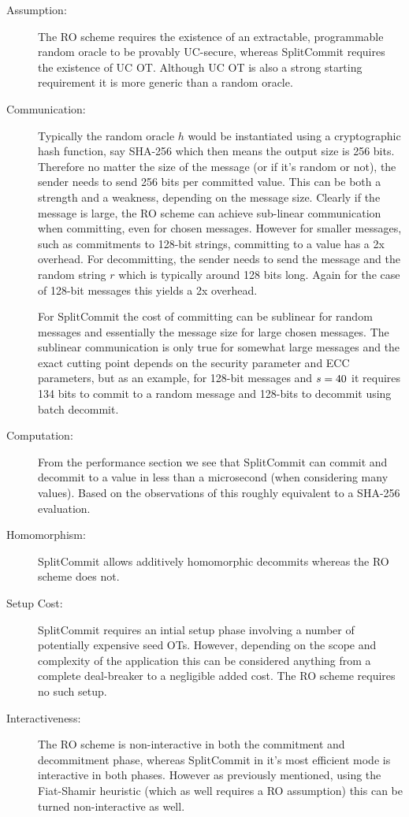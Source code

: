 \begin{description}
  \item[Assumption:] The RO scheme requires the existence of an extractable, programmable random oracle to be provably UC-secure, whereas SplitCommit requires the existence of UC OT. Although UC OT is also a strong starting requirement it is more generic than a random oracle.
  \item[Communication:] Typically the random oracle $h$ would be instantiated using a cryptographic hash function, say SHA-256 which then means the output size is 256 bits. Therefore no matter the size of the message (or if it's random or not), the sender needs to send 256 bits per committed value. This can be both a strength and a weakness, depending on the message size. Clearly if the message is large, the RO scheme can achieve sub-linear communication when committing, even for chosen messages. However for smaller messages, such as \eg commitments to 128-bit strings, committing to a value has a 2x overhead. For decommitting, the sender needs to send the message and the random string $r$ which is typically around 128 bits long. Again for the case of 128-bit messages this yields a 2x overhead.

  For SplitCommit the cost of committing can be sublinear for random messages and essentially the message size for large chosen messages. The sublinear communication is only true for somewhat large messages and the exact cutting point depends on the security parameter and ECC parameters, but as an example, for 128-bit messages and $s=40$ it requires 134 bits to commit to a random message and 128-bits to decommit using batch decommit.

  \item[Computation:] From the performance section we see that SplitCommit can commit and decommit to a value in less than a microsecond (when considering many values). Based on the observations of \cite{DBLP:conf/pkc/CascudoDDGNT15} this roughly equivalent to a SHA-256 evaluation.
  \item[Homomorphism:] SplitCommit allows additively homomorphic decommits whereas the RO scheme does not.
  \item[Setup Cost:] SplitCommit requires an intial setup phase involving a number of potentially expensive seed OTs. However, depending on the scope and complexity of the application this can be considered anything from a complete deal-breaker to a negligible added cost. The RO scheme requires no such setup.
  \item[Interactiveness:] The RO scheme is non-interactive in both the commitment and decommitment phase, whereas SplitCommit in it's most efficient mode is interactive in both phases. However as previously mentioned, using the Fiat-Shamir heuristic (which as well requires a RO assumption) this can be turned non-interactive as well.
\end{description}


